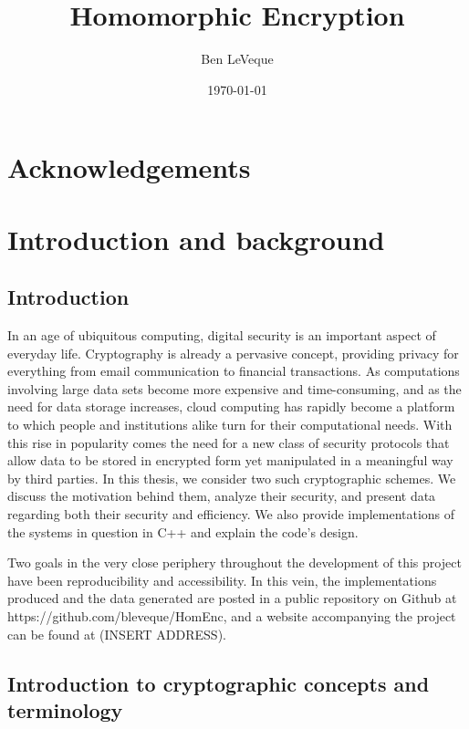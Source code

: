\documentclass[11pt]{report}
\title{Homomorphic Encryption}
\author{Ben LeVeque}
\date{\today}
\begin{document}
\maketitle


\tableofcontents

\newpage

\chapter{Acknowledgements}


\chapter{Introduction and background}

\section{Introduction}

In an age of ubiquitous computing, digital security is an important aspect of everyday life. Cryptography is already a pervasive concept, providing privacy for everything from email communication to financial transactions. As computations involving large data sets become more expensive and time-consuming, and as the need for data storage increases, cloud computing has rapidly become a platform to which people and institutions alike turn for their computational needs. With this rise in popularity comes the need for a new class of security protocols that allow data to be stored in encrypted form yet manipulated in a meaningful way by third parties. In this thesis, we consider two such cryptographic schemes. We discuss the motivation behind them, analyze their security, and present data regarding both their security and efficiency. We also provide implementations of the systems in question in C++ and explain the code's design.

Two goals in the very close periphery throughout the development of this project have been reproducibility and accessibility. In this vein, the implementations produced and the data generated are posted in a public repository on Github at https://github.com/bleveque/HomEnc, and a website accompanying the project can be found at (INSERT ADDRESS).

\section{Introduction to cryptographic concepts and terminology} 
\end{document}
